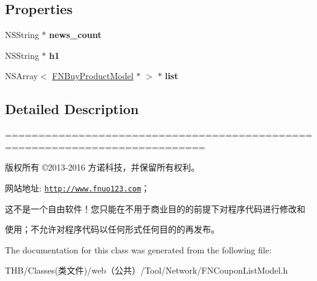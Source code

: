 \subsection*{Properties}
\begin{DoxyCompactItemize}
\item 
\mbox{\label{interface_f_n_coupon_list_model_ab30ebad2957e23ad30e0992200b829ea}} 
N\+S\+String $\ast$ {\bfseries news\+\_\+count}
\item 
\mbox{\label{interface_f_n_coupon_list_model_a1a89632d92c6affca9b3ea7b56ca2de2}} 
N\+S\+String $\ast$ {\bfseries h1}
\item 
\mbox{\label{interface_f_n_coupon_list_model_a70724c5ddc276946da115f539c8308b2}} 
N\+S\+Array$<$ \mbox{\hyperlink{interface_f_n_buy_product_model}{F\+N\+Buy\+Product\+Model}} $\ast$ $>$ $\ast$ {\bfseries list}
\end{DoxyCompactItemize}


\subsection{Detailed Description}
============================================================================

版权所有 ©2013-\/2016 方诺科技，并保留所有权利。

网站地址\+: \href{http://www.fnuo123.com}{\tt http\+://www.\+fnuo123.\+com}； 



这不是一个自由软件！您只能在不用于商业目的的前提下对程序代码进行修改和

使用；不允许对程序代码以任何形式任何目的的再发布。 

 

The documentation for this class was generated from the following file\+:\begin{DoxyCompactItemize}
\item 
T\+H\+B/\+Classes(类文件)/web（公共）/\+Tool/\+Network/F\+N\+Coupon\+List\+Model.\+h\end{DoxyCompactItemize}
